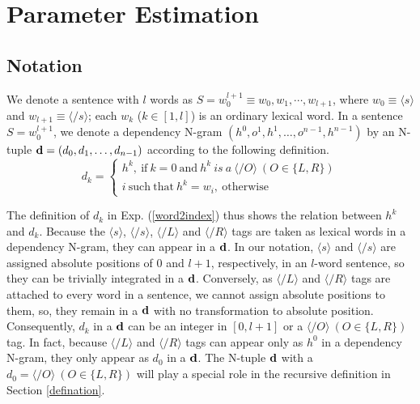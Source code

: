 \documentclass[english]{jnlp_1.4}
\begin{document}
\section{Parameter Estimation}
\label{parameterestimation}
\vspace{-0.5\Cvs}

\subsection{Notation}
\label{notation}

We denote a sentence with $l$ words as $S=w_{0}^{l+1}\equiv w_0, w_1, \cdots, w_{l+1}$, where $w_0\equiv\langle s \rangle$ and $w_{l+1}\equiv\langle \slash s \rangle$; each $w_k$ ($k \in [1,l]$) is an ordinary lexical word.
In a sentence $S=w_{0}^{l+1}$, we denote a  dependency N-gram $(h^0, o^1, h^1, \dots, o^{n-1}, h^{n-1})$ by an N-tuple ${\bf{d}} = (d_0, d_1, \dots, d_{n-1})$ according to the following definition.
\begin{equation}
\label{word2index}
d_k=
\begin{cases}
h^k,\ \mathrm{if}\ k= 0\ \mathrm{and}\ h^k\ \mathit{is\ a}\ \langle \slash O \rangle\ (O \in \{L, R\}) \\
i\ \mathrm{such\ that}\ h^k=w_i,\ \mathrm{otherwise}
\end{cases}
\end{equation}
 
The definition of $d_k$ in Exp. (\ref{word2index}) thus shows the relation between $h^k$ and $d_k$. Because the $\langle s \rangle$, $\langle \slash s \rangle$, $\langle \slash L \rangle$ and $\langle \slash R \rangle$ tags are taken as lexical words in a dependency N-gram, they can appear in a ${\bf{d}}$. 
In our notation, $\langle s \rangle$ and $\langle \slash s \rangle$ are assigned absolute positions of $0$ and $l+1$, respectively, in an $l$-word sentence, so they can be trivially integrated in a ${\bf{d}}$.
Conversely, as $\langle \slash L \rangle$ and $\langle \slash R \rangle$ tags are attached to every word in a sentence, we cannot assign absolute positions to them,
so, they remain in a ${\bf{d}}$ with no transformation to absolute position. 
Consequently, $d_k$ in a ${\bf{d}}$ can be an integer in $[0, l+1]$ or a $\langle \slash O \rangle\ (O \in \{L, R\})$ tag.
In fact, because $\langle \slash L \rangle$ and $\langle \slash R \rangle$ tags can appear only as $h^0$ in a dependency N-gram, they only appear as $d_0$ in a ${\bf{d}}$.
The N-tuple ${\bf{d}}$ with a $d_0 = \langle \slash O \rangle\ (O \in \{L, R\})$ 
will play a special role in the recursive definition in Section \ref{defination}.
\end{document}
